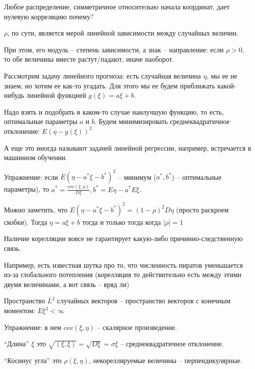 Любое распределение, симметричное относительно начала координат, дает нулевую корреляцию \TODO почему?

\begin{Rem}
    $\rho$, по сути, является мерой линейной зависимости между случайных величин. 

    При этом, его модуль -- степень зависимости, а знак -- направление: если $\rho > 0$, то обе величины вместе растут/падают, иначе наоборот.
\end{Rem}

Рассмотрим задачу линейного прогноза: есть случайная величина $\eta$, мы ее не знаем, но хотим ее как-то угадать.
Для этого мы ее будем приближать какой-нибудь линейной функцией $g(\xi) = a\xi + b$. 

Надо взять и подобрать в каком-то случае наилучшую функцию, то есть, оптимальные параметры $a$ и $b$. 
Будем минимизировать среднеквадратичное отклонение: $E(\eta - g(\xi))^2$
\begin{Rem}
А еще это иногда называют задачей линейной регрессии, например, встречается в машинном обучении.
\end{Rem}

Упражнение: если $E(\eta - a^*\xi -b^*)^2$ -- минимум ($a^*, b^*$) -- оптимальные параметры), то $a^* = \frac{cov(\xi, \eta)}{D\xi}, b^* = E\eta - a^*E\xi$.

Можно заметить, что $E(\eta - a^*\xi -b^*)^2 = (1 - \rho)^2 D\eta$ (просто раскроем скобки). Тогда $\eta =  a\xi + b$ тогда и только тогда когда $|\rho| = 1$

\begin{Rem}
Наличие корелляции вовсе не гарантирует какую-либо причинно-следственную связь. 

Например, есть известная шутка про то, что численность пиратов уменьшается из-за глобального потепления (корелляция то действительно есть между этими двумя величинами, а вот связь -- вряд ли) 
\end{Rem}

\begin{Def}
Пространство $L^2$ случайных векторов -- пространство векторов с конечным моментом: $E \xi^2 < \infty$
\end{Def}

Упражнение: в нем $cov(\xi, \eta)$ -- скалярное произведение.

``Длина'' $\xi$ это $\sqrt{(\xi, \xi)} = \sqrt{D\xi} = \sigma \xi$ -- среднеквадратичное отклонение.

``Косинус угла'' это $\rho(\xi, \eta)$, некореллируемые величины -- перпендикулярные.

